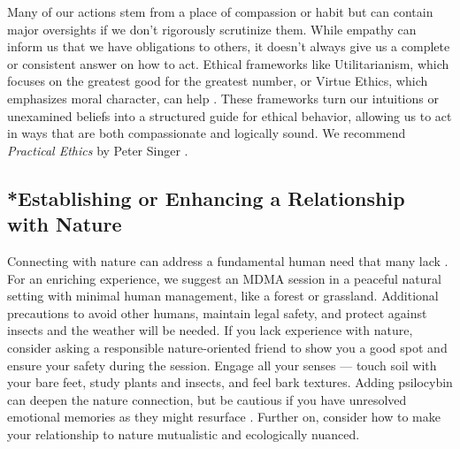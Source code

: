\documentclass[12pt,letterpaper]{article}
\begin{document}
Many of our actions stem from a place of compassion or habit but can contain major oversights if we don't rigorously scrutinize them. While empathy can inform us that we have obligations to others, it doesn't always give us a complete or consistent answer on how to act. Ethical frameworks like Utilitarianism, which focuses on the greatest good for the greatest number, or Virtue Ethics, which emphasizes moral character, can help \cite{IEPUtilitarianism,IEPVirtueEthics}. These frameworks turn our intuitions or unexamined beliefs into a structured guide for ethical behavior, allowing us to act in ways that are both compassionate and logically sound. We recommend \textit{Practical Ethics} by Peter Singer \cite{singerPractical}.  
\subsection{*Establishing or Enhancing a Relationship with Nature}
Connecting with nature can address a fundamental human need that many lack \cite{caoimheGreenspaceOutcomes, baxterNatureRelatedness}. For an enriching experience, we suggest an MDMA session in a peaceful natural setting with minimal human management, like a forest or grassland. Additional precautions to avoid other humans, maintain legal safety, and protect against insects and the weather will be needed. If you lack experience with nature, consider asking a responsible nature-oriented friend to show you a good spot and ensure your safety during the session. Engage all your senses — touch soil with your bare feet, study plants and insects, and feel bark textures. Adding psilocybin can deepen the nature connection, but be cautious if you have unresolved emotional memories as they might resurface \cite{forstmannPsilocybinNature}. Further on, consider how to make your relationship to nature mutualistic and ecologically nuanced.
\end{document}
